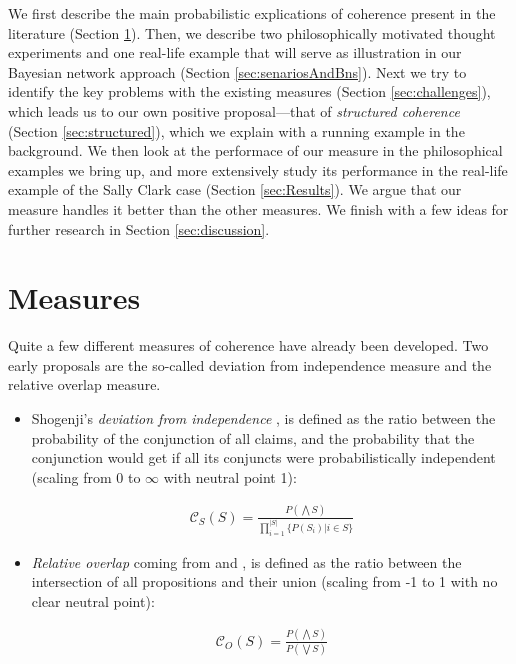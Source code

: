 \documentclass[10pt,]{scrartcl}
\begin{document}
We first describe the main probabilistic explications of coherence present in the literature (Section \ref{sec:measures}). Then, we describe two philosophically motivated thought experiments and one real-life example that will serve as illustration in our Bayesian network approach (Section \ref{sec:senariosAndBns}). Next we try to identify the key problems with  the existing measures (Section \ref{sec:challenges}), which leads us to our own positive proposal---that of \emph{structured coherence} (Section \ref{sec:structured}), which we explain with a running example in the background. We then look at the performace of our measure in the philosophical examples we bring up, and more extensively study its performance in the  real-life example of the Sally Clark case (Section \ref{sec:Results}). We argue that our measure handles it better than the other measures.  
We finish with a few ideas for further research in Section \ref{sec:discussion}. 







\section{Measures}\label{sec:measures}

Quite a few different measures of coherence have already been developed.  Two early proposals are the so-called deviation from independence measure and  the relative overlap measure.

\begin{itemize}
    \item  Shogenji's 
  \textit{deviation from independence} \citep{shogenji1999conducive}, is defined as the ratio between the probability of the
conjunction of all claims, and the probability that the conjunction
would get if all its conjuncts were probabilistically independent (scaling from 0 to $\infty$ with neutral point 1):

\begin{align}
    \tag{Shogenji}
    \label{coh:Shogenji}
     \mathcal{C}_{S}(S)=\frac{P(\bigwedge S)}{\prod_{i=1}^{\vert S \vert}\{P(S_i)\vert i \in S\}}
\end{align}

\item  \textit{Relative overlap} coming from \citep{olsson2001conducive} and \citep{glass2002}, is defined as the ratio  between the intersection of all propositions and their union (scaling from -1 to 1 with no clear neutral point):

\begin{align}
    \tag{Olsson}
    \label{coh:Olsson}
    \mathcal{C}_{O}(S)=\frac{P(\bigwedge S)}{P(\bigvee S)}
\end{align}


\end{itemize}
\end{document}
